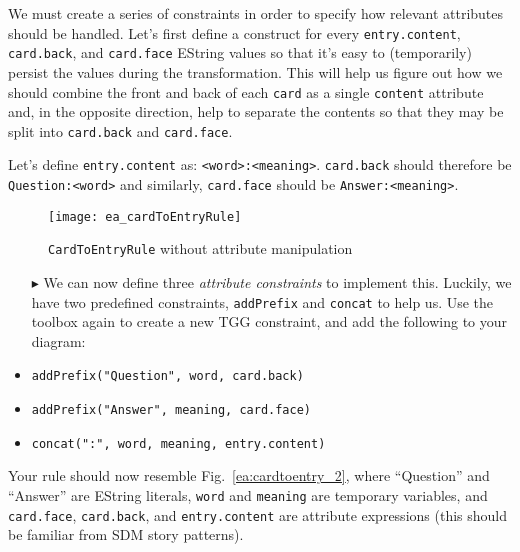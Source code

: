 We must create a series of constraints in order to specify how relevant attributes should be handled. Let's first define a construct for every
\texttt{entry\-.cont\-ent}, \texttt{card.back}, and \texttt{card.face} EString values so that it's easy to (temporarily) persist the values during the
transformation. This will help us figure out how we should combine the front and back of each \texttt{card} as a single \texttt{content} attribute and,
in the opposite direction, help to separate the contents so that they may be split into \texttt{card.back} and \texttt{card.face}.

Let's define \texttt{entry\-.cont\-ent} as: \texttt{<word>:<mean\-ing>}. \texttt{card\-.back} should therefore be \texttt{Quest\-ion:<word>} and
similarly, \texttt{card\-.face} should be \texttt{Ans\-wer:<mean\-ing>}. 

\newpage

  \begin{figure}[htbp]
  \begin{center}
    \texttt{[image: ea\_cardToEntryRule]}
    \caption{\texttt{CardToEntryRule} without attribute manipulation}
    \label{ea:cardtoentry_1}
  \end{center}
  \end{figure}


\begin{itemize}

\item[$\blacktriangleright$] We can now define three \emph{attribute constraints} to implement this. Luckily, we have two predefined constraints,
\texttt{addPrefix} and \texttt{concat} to help us. Use the toolbox again to create a new TGG constraint, and add the following to your diagram:

  \item \verb|addPrefix("Question", word, card.back)|  
  
  \item \verb|addPrefix("Answer", meaning, card.face)|
  
  \item \verb|concat(":", word, meaning, entry.content)|

\end{itemize}

Your rule should now resemble Fig.~\ref{ea:cardtoentry_2}, where ``Question'' and ``Answer'' are EString literals, \texttt{word} and \texttt{meaning} are
temporary variables, and \texttt{card.face}, \texttt{card.back}, and \texttt{entry.content} are attribute expressions (this should be familiar from SDM story
patterns).

